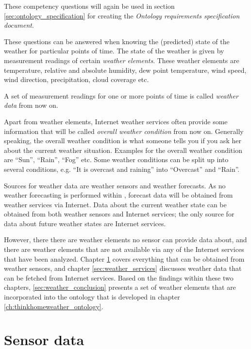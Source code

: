 These competency questions will again be used in section \ref{sec:ontology_specification} for creating the \emph{Ontology requirements specification document}.

These questions can be answered when knowing the (predicted) state of the weather for particular points of time. The state of the weather is given by measurement readings of certain \emph{weather elements}. These weather elements are temperature, relative and absolute humidity, dew point temperature, wind speed, wind direction, precipitation, cloud coverage etc.

A set of measurement readings for one or more points of time is called \emph{weather data} from now on.

Apart from weather elements, Internet weather services often provide some information that will be called \emph{overall weather condition} from now on. Generally speaking, the overall weather condition is what someone tells you if you ask her about the current weather situation. Examples for the overall weather condition are ``Sun'', ``Rain'', ``Fog'' etc. Some weather conditions can be split up into several conditions, e.g. ``It is overcast and raining'' into ``Overcast'' and ``Rain''.

Sources for weather data are weather sensors and weather forecasts. As no weather forecasting is performed within \thinkhome, forecast data will be obtained from weather services via Internet. Data about the current weather state can be obtained from both weather sensors and Internet services; the only source for data about future weather states are Internet services.

However, there there are weather elements no sensor can provide data about, and there are weather elements that are not available via any of the Internet services that have been analyzed. Chapter \ref{sec:weather_sensors} covers everything that can be obtained from weather sensors, and chapter \ref{sec:weather_services} discusses weather data that can be fetched from Internet services. Based on the findings within these two chapters, \ref{sec:weather_conclusion} presents a set of weather elements that are incorporated into the ontology that is developed in chapter \ref{ch:thinkhomeweather_ontology}.

\section{Sensor data}
\label{sec:weather_sensors}

